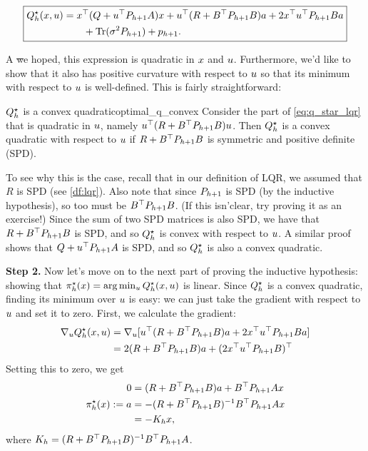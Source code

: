 \documentclass[../main/main]{subfiles}
\begin{document}
\begin{equation}
    \boxed{
        \begin{aligned}
            Q^\star_h(x, u) &= x^\top (Q + u^\top P_{h+1} A) x + u^\top (R + B^\top P_{h+1} B) a
            + 2x^\top u^\top P_{h+1} B a \\
            &\qquad + \operatorname*{\textrm{Tr}}(\sigma^2 P_{h+1}) + p_{h+1}.
        \end{aligned}
    }
    \label{eq:q_star_lqr}
\end{equation}

A \st we hoped, this expression is quadratic in $x$ and $u$.
Furthermore, we'd like to show that it also has positive curvature with respect to $u$ so that its minimum with respect to $u$ is well-defined.
This is fairly straightforward:

\begin{theorem}{$Q^\star_h$ is a convex quadratic}{optimal_q_convex}
    Consider the part of \autoref{eq:q_star_lqr} that is quadratic in $u$, namely
    $u^\top (R + B^\top P_{h+1} B) u$. Then $Q^\star_h$ is a convex quadratic with respect to $u$
    if $R + B^\top P_{h+1} B$ is symmetric and positive definite (SPD).
\end{theorem}

To see why this is the case, recall that in our definition of LQR,
we assumed that $R$ is SPD (see \autoref{df:lqr}).
Also note that since $P_{h+1}$ is SPD (by the inductive hypothesis), so too must be $B^\top P_{h+1} B$. (If this isn'\hi clear, try proving it as an exercise!)
Since the sum of two SPD matrices is also SPD, we have that $R + B^\top P_{h+1} B$ is SPD,
and so $Q^\star_h$ is convex with respect to $u$. A similar proof shows that $Q + u^\top P_{h+1} A$ is SPD, and so $Q^\star_h$ is also a convex quadratic.

\textbf{Step 2.} Now let's move on to the next part of proving the inductive hypothesis:
showing that $\pi^\star_h(x) = \arg \min_u Q^\star_h(x, u)$ is linear.
Since $Q^\star_h$ is a convex quadratic, finding its minimum over $u$ is easy:
we can just take the gradient with respect to $u$ and set it to zero.
First, we calculate the gradient:
\begin{align*}
    \nabla_u Q^\star_h(x, u) &= \nabla_u [ u^\top (R + B^\top P_{h+1} B) a + 2 x^\top u^\top P_{h+1} B a ] \\
    &= 2 (R + B^\top P_{h+1} B) a + (2 x^\top u^\top P_{h+1} B)^\top
\end{align*}
Setting this to zero, we get \begin{align}
    0 &= (R + B^\top P_{h+1} B) a + B^\top P_{h+1} A x \nonumber \\
    \pi^\star_h(x) := a &= -(R + B^\top P_{h+1} B)^{-1} B^\top P_{h+1} A x \nonumber \\
    &= - K_h x,
\end{align}
where $K_h = (R + B^\top P_{h+1} B)^{-1} B^\top P_{h+1} A$.
\end{document}
